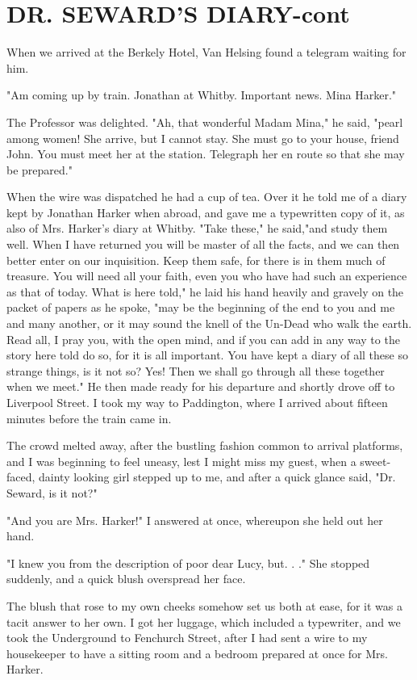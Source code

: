 \chapter{DR. SEWARD'S DIARY-cont}

When we arrived at the Berkely Hotel, Van Helsing found a telegram waiting for him. 

"Am coming up by train. Jonathan at Whitby. Important news. Mina Harker." 

The Professor was delighted. "Ah, that wonderful Madam Mina," he said, "pearl among women! She arrive, but I cannot stay. She must go to your house, friend John. You must meet her at the station. Telegraph her en route so that she may be prepared." 

When the wire was dispatched he had a cup of tea. Over it he told me of a diary kept by Jonathan Harker when abroad, and gave me a typewritten copy of it, as also of Mrs. Harker's diary at Whitby. "Take these," he said,"and study them well. When I have returned you will be master of all the facts, and we can then better enter on our inquisition. Keep them safe, for there is in them much of treasure. You will need all your faith, even you who have had such an experience as that of today. What is here told," he laid his hand heavily and gravely on the packet of papers as he spoke, "may be the beginning of the end to you and me and many another, or it may sound the knell of the Un-Dead who walk the earth. Read all, I pray you, with the open mind, and if you can add in any way to the story here told do so, for it is all important. You have kept a diary of all these so strange things, is it not so? Yes! Then we shall go through all these together when we meet." He then made ready for his departure and shortly drove off to Liverpool Street. I took my way to Paddington, where I arrived about fifteen minutes before the train came in. 

The crowd melted away, after the bustling fashion common to arrival platforms, and I was beginning to feel uneasy, lest I might miss my guest, when a sweet-faced, dainty looking girl stepped up to me, and after a quick glance said, "Dr. Seward, is it not?" 

"And you are Mrs. Harker!" I answered at once, whereupon she held out her hand. 

"I knew you from the description of poor dear Lucy, but. . ." She stopped suddenly, and a quick blush overspread her face. 

The blush that rose to my own cheeks somehow set us both at ease, for it was a tacit answer to her own. I got her luggage, which included a typewriter, and we took the Underground to Fenchurch Street, after I had sent a wire to my housekeeper to have a sitting room and a bedroom prepared at once for Mrs. Harker. 

